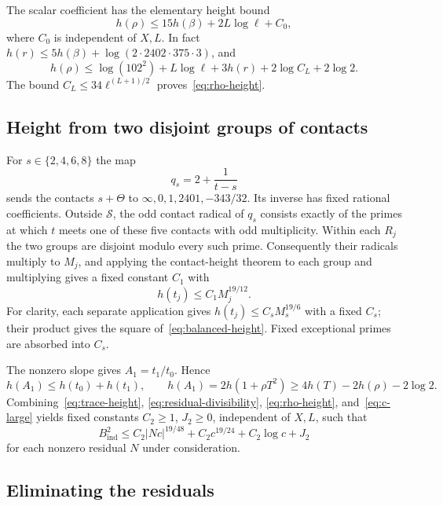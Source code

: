 \documentclass[11pt,a4paper]{article}
\begin{document}
The scalar coefficient has the elementary height bound
\begin{equation}\label{eq:rho-height}
                    h(\rho)\le15h(\beta)+2L\log\ell+C_0,
\end{equation}
where $C_0$ is independent of $X,L$. In fact
$h(r)\le5h(\beta)+\log(2\cdot2402\cdot375\cdot3)$, and
\[
 h(\rho)\le\log(102^2)+L\log\ell+3h(r)+2\log C_L+2\log2.
\]
The bound $C_L\le34\ell^{(L+1)/2}$ proves~\eqref{eq:rho-height}.

\subsection{Height from two disjoint groups of contacts}

For $s\in\{2,4,6,8\}$ the map
\[
                       q_s=2+\frac1{t-s}
\]
sends the contacts $s+\Theta$ to
$\infty,0,1,2401,-343/32$. Its inverse has fixed rational
coefficients. Outside $\mathcal S$, the odd contact radical of
$q_s$ consists exactly of the primes at which $t$ meets one of
these five contacts with odd multiplicity. Within each $R_j$ the
two groups are disjoint modulo every such prime. Consequently their
radicals multiply to $M_j$, and applying the contact-height theorem
to each group and multiplying gives a fixed constant $C_1$ with
\begin{equation}\label{eq:balanced-height}
                         h(t_j)\le C_1 M_j^{19/12}.
\end{equation}
For clarity, each separate application gives
$h(t_j)\le C_sM_s^{19/6}$ with a fixed $C_s$; their product gives
the square of~\eqref{eq:balanced-height}. Fixed exceptional primes
are absorbed into $C_s$.

The nonzero slope gives $A_1=t_1/t_0$. Hence
\[
 h(A_1)\le h(t_0)+h(t_1),\qquad
 h(A_1)=2h(1+\rho T^2)\ge4h(T)-2h(\rho)-2\log2.
\]
Combining~\eqref{eq:trace-height}, \eqref{eq:residual-divisibility},
\eqref{eq:rho-height}, and~\eqref{eq:c-large} yields fixed
constants $C_2\ge1$, $J_2\ge0$, independent of $X,L$, such that
\begin{equation}\label{eq:common-height}
 B_{\mathrm{ind}}^2\le C_2|Nc|^{19/48}
             +C_2c^{19/24}+C_2\log c+J_2
\end{equation}
for each nonzero residual $N$ under consideration.

\subsection{Eliminating the residuals}
\end{document}

